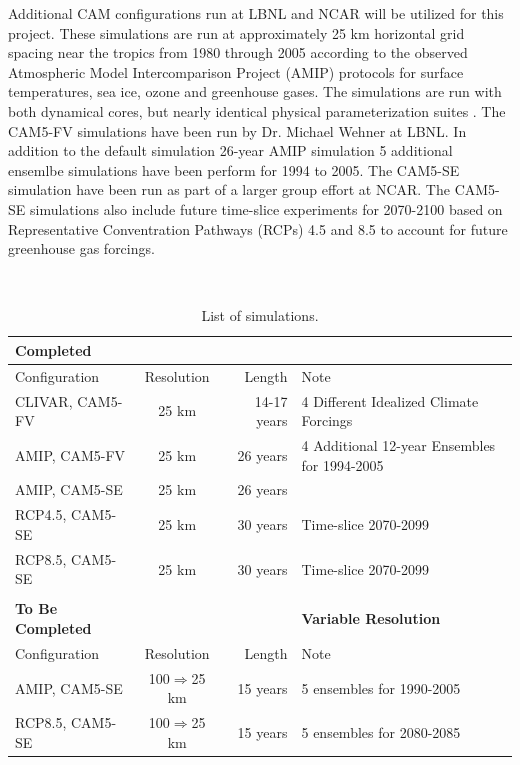 \documentclass[11pt]{article}
\begin{document}
Additional CAM configurations run at LBNL and NCAR will be utilized for this project. These simulations are run at approximately 25 km horizontal grid spacing near the tropics from 1980 through 2005 according to the observed Atmospheric Model Intercomparison Project (AMIP) protocols \citep{Gates1992,Gates1999} for surface temperatures, sea ice, ozone and greenhouse gases. The simulations are run with both dynamical cores, but nearly identical physical parameterization suites \citep{RBNetal2010NCAR}. The CAM5-FV simulations have been run by Dr. Michael Wehner at LBNL. In addition to the default simulation 26-year AMIP simulation 5 additional ensemlbe simulations have been perform for 1994 to 2005. The CAM5-SE simulation have been run as part of a larger group effort at NCAR. The CAM5-SE simulations also include future time-slice experiments for 2070-2100 based on Representative Conventration Pathways (RCPs) 4.5 and 8.5 to account for future greenhouse gas forcings. 

\begin{table} 
\begin{center}
\caption{List of simulations.\label{t:runs} }
\ \\
\begin{tabular}{l c r l}
\textbf{Completed} \\
\hline
Configuration & Resolution & Length & Note \\ 
\hline
CLIVAR, CAM5-FV & 25 km & 14-17 years & 4 Different Idealized Climate Forcings  \\
AMIP, CAM5-FV & 25 km & 26 years    & 4 Additional 12-year Ensembles for 1994-2005 \\
AMIP, CAM5-SE & 25 km & 26 years    & \\
RCP4.5, CAM5-SE & 25 km & 30 years    & Time-slice 2070-2099 \\
RCP8.5, CAM5-SE & 25 km & 30 years    & Time-slice 2070-2099 \\
\hline
\\
\textbf{To Be Completed} & & & \textbf{Variable Resolution}\\
\hline
Configuration & Resolution & Length & Note \\ 
\hline
AMIP, CAM5-SE & 100$\Rightarrow$25 km & 15 years    & 5 ensembles for 1990-2005 \\
RCP8.5, CAM5-SE & 100$\Rightarrow$25 km & 15 years    & 5 ensembles for 2080-2085 \\
\hline
\end{tabular}
\end{center}
\end{table}
\end{document}
